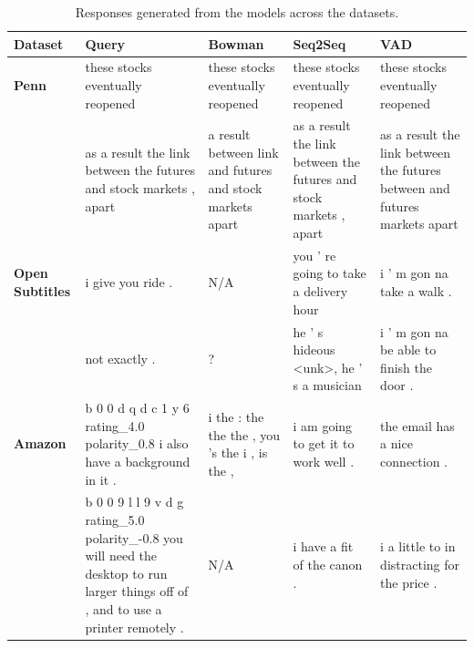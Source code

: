 \documentclass[12pt,twoside]{report}
\begin{document}
\begin{table}[!ht]
	\centering
	\footnotesize
	\begin{tabular}{|p{1.5cm}|p{2.8cm}|p{2.8cm}|p{2.8cm}|p{2.8cm}|}
		\hline
		\textbf{Dataset}       & \textbf{Query}                                                                                                                                & \textbf{Bowman}                                           & \textbf{Seq2Seq}                                                   & \textbf{VAD}                                                               \\ \hline
		\textbf{Penn}          & these stocks eventually reopened                                                                                                              & these stocks eventually reopened                          & these stocks eventually reopened                                   & these stocks eventually reopened                                           \\ \cline{2-5} 
													 & as a result the link between the futures and stock markets , apart                                                                            & a result between link and futures and stock markets apart & as a result the link between the futures and stock markets , apart & as a result the link between the futures between and futures markets apart \\ \hline
		\textbf{Open Subtitles} & i give you ride .                                                                                                                             & N/A                                                       & you ' re going to take a delivery hour                             & i ' m gon na take a walk .                                                 \\ \cline{2-5} 
													 & not exactly .                                                                                                                                 & ?                                                         & he ' s hideous \textless{}unk\textgreater , he ' s a musician      & i ' m gon na be able to finish the door .                                  \\ \hline
		\textbf{Amazon}        & b 0 0 d q d c 1 y 6 rating\_4.0 polarity\_0.8 i also have a background in it .                                                                & i the : the the the , you 's the i , is the ,             & i am going to get it to work well .                                & the email has a nice connection .                                          \\ \cline{2-5} 
													 & b 0 0 9 l l 9 v d g rating\_5.0 polarity\_-0.8 you will need the desktop to run larger things off of , and to use a printer remotely . & N/A                                                       & i have a fit of the canon .                                        & i a little to in distracting for the price .                               \\ \hline
	\end{tabular}
	\caption{Responses generated from the models across the datasets.}
	\label{qualitative_table}
\end{table}
\end{document}
